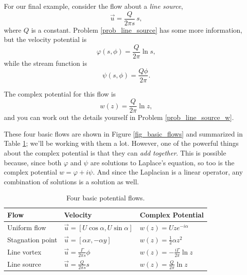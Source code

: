 \begin{example}
For our final example, consider the flow about a \emph{line source},
\begin{equation}
\vec{u} = \frac{Q}{2\pi s} \, \unit{s},
\end{equation}
where $Q$ is a constant.  Problem \ref{prob_line_source} has some more information, but the velocity potential is
\begin{equation}
\varphi (s, \phi) = \frac{Q}{2\pi} \ln s,
\end{equation}
while the stream function is
\begin{equation}
\psi(s, \phi) = \frac{Q \phi}{2\pi}.
\end{equation}

The complex potential for this flow is
\begin{equation}
w(z) = \frac{Q}{2\pi} \ln z,
\end{equation}
and you can work out the details yourself in Problem \ref{prob_line_source_w}.
\end{example}

These four basic flows are shown in Figure \ref{fig_basic_flows} and summarized in Table \ref{tab_pot_flows}; we'll be working with them a lot.  However, one of the powerful things about the complex potential is that they can \emph{add together}.  This is possible because, since both $\varphi$ and $\psi$ are solutions to Laplace's equation, so too is the complex potential $w = \varphi + i\psi$.  And since the Laplacian is a linear operator, any combination of solutions is a solution as well.

\begin{table}[t]
\caption{Four basic potential flows.}
\centering
  \begin{tabular}{l|l|l}
  Flow & Velocity & Complex Potential \\ \hline
  Uniform flow & $\vec{u} = [U\cos \alpha, U\sin \alpha]$ &  $w(z) = Uz e^{-i\alpha}$ \\
  Stagnation point & $\vec{u} = [\alpha x, -\alpha y]$ &  $w(z) = \frac{1}{2} \alpha z^2$ \\
  Line vortex & $\vec{u} = \frac{\Gamma}{2\pi s} \unit{\phi}$ & $w(z) = -\frac{i\Gamma}{2\pi} \ln z $ \\
  Line source & $\vec{u} = \frac{Q}{2\pi s} \unit{s}$ & $w(z) = \frac{Q}{2\pi} \ln z$
  \end{tabular}
  
  \label{tab_pot_flows}
\end{table}


